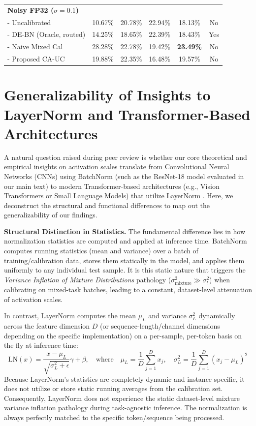 \documentclass{article}
\theoremstyle{plain}
\theoremstyle{definition}
\theoremstyle{remark}
\begin{document}
\begin{table}[H]
\begin{center}
\begin{small}
\begin{tabular}{lccccc}
\midrule
\textbf{Noisy FP32 ($\sigma = 0.1$)} & & & & & \\
- Uncalibrated & 10.67\% & 20.78\% & 22.94\% & 18.13\% & No \\
- DE-BN (Oracle, routed) & 14.25\% & 18.65\% & 22.39\% & 18.43\% & Yes \\
- Naive Mixed Cal & 28.28\% & 22.78\% & 19.42\% & \textbf{23.49\%} & No \\
- Proposed CA-UC & 19.88\% & 22.35\% & 16.48\% & 19.57\% & No \\
\bottomrule
\end{tabular}
\end{small}
\end{center}
\end{table}

\section{Generalizability of Insights to LayerNorm and Transformer-Based Architectures}
\label{sec:appendix_layernorm}

A natural question raised during peer review is whether our core theoretical and empirical insights on activation scales translate from Convolutional Neural Networks (CNNs) using BatchNorm (such as the ResNet-18 model evaluated in our main text) to modern Transformer-based architectures (e.g., Vision Transformers or Small Language Models) that utilize LayerNorm \cite{Ba2016LayerNorm}. Here, we deconstruct the structural and functional differences to map out the generalizability of our findings.

\textbf{Structural Distinction in Statistics.} 
The fundamental difference lies in how normalization statistics are computed and applied at inference time. BatchNorm computes running statistics (mean and variance) over a batch of training/calibration data, stores them statically in the model, and applies them uniformly to any individual test sample. It is this static nature that triggers the \textit{Variance Inflation of Mixture Distributions} pathology ($\sigma^2_{\text{mixture}} \gg \sigma^2_t$) when calibrating on mixed-task batches, leading to a constant, dataset-level attenuation of activation scales.

In contrast, LayerNorm computes the mean $\mu_L$ and variance $\sigma^2_L$ dynamically across the feature dimension $D$ (or sequence-length/channel dimensions depending on the specific implementation) on a per-sample, per-token basis on the fly at inference time:
\begin{equation}
\text{LN}(x) = \frac{x - \mu_L}{\sqrt{\sigma^2_L + \epsilon}} \gamma + \beta, \quad \text{where} \quad \mu_L = \frac{1}{D} \sum_{j=1}^D x_j, \quad \sigma^2_L = \frac{1}{D} \sum_{j=1}^D (x_j - \mu_L)^2
\end{equation}
Because LayerNorm's statistics are completely dynamic and instance-specific, it does not utilize or store static running averages from the calibration set. Consequently, LayerNorm does not experience the static dataset-level mixture variance inflation pathology during task-agnostic inference. The normalization is always perfectly matched to the specific token/sequence being processed.
\end{document}
